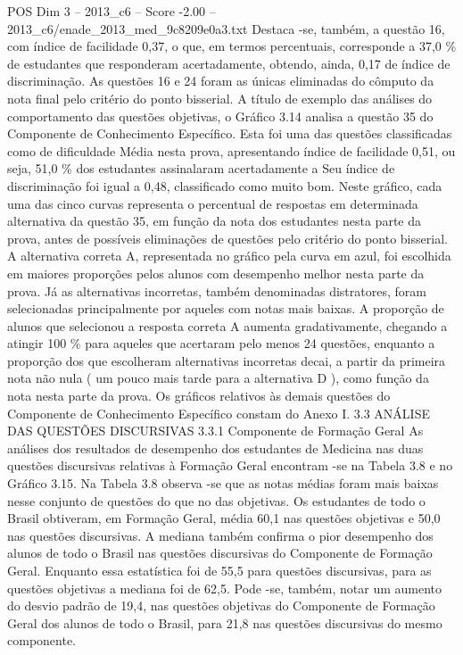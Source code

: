 \begin{textsample}{POS Dim 3 – 2013\_c6 – Score -2.00 – 2013\_c6/enade\_2013\_med\_9c8209e0a3.txt}
Destaca -se, também, a questão 16, com índice de facilidade 0,37, o que, em termos percentuais, corresponde a 37,0 \% de estudantes que responderam acertadamente, obtendo, ainda, 0,17 de índice de discriminação.
As questões 16 e 24 foram as únicas eliminadas do cômputo da nota final pelo critério do ponto bisserial.
A título de exemplo das análises do comportamento das questões objetivas, o Gráfico 3.14 analisa a questão 35 do Componente de Conhecimento Específico.
Esta foi uma das questões classificadas como de dificuldade Média nesta prova, apresentando índice de facilidade 0,51, ou seja, 51,0 \% dos estudantes assinalaram acertadamente a Seu índice de discriminação foi igual a 0,48, classificado como muito bom.
Neste gráfico, cada uma das cinco curvas representa o percentual de respostas em determinada alternativa da questão 35, em função da nota dos estudantes nesta parte da prova, antes de possíveis eliminações de questões pelo critério do ponto bisserial.
A alternativa correta A, representada no gráfico pela curva em azul, foi escolhida em maiores proporções pelos alunos com desempenho melhor nesta parte da prova.
Já as alternativas incorretas, também denominadas distratores, foram selecionadas principalmente por aqueles com notas mais baixas.
A proporção de alunos que selecionou a resposta correta A aumenta gradativamente, chegando a atingir 100 \% para aqueles que acertaram pelo menos 24 questões, enquanto a proporção dos que escolheram alternativas incorretas decai, a partir da primeira nota não nula ( um pouco mais tarde para a alternativa D ), como função da nota nesta parte da prova.
Os gráficos relativos às demais questões do Componente de Conhecimento Específico constam do Anexo I. 3.3 ANÁLISE DAS QUESTÕES DISCURSIVAS 3.3.1 Componente de Formação Geral As análises dos resultados de desempenho dos estudantes de Medicina nas duas questões discursivas relativas à Formação Geral encontram -se na Tabela 3.8 e no Gráfico 3.15.
Na Tabela 3.8 observa -se que as notas médias foram mais baixas nesse conjunto de questões do que no das objetivas.
Os estudantes de todo o Brasil obtiveram, em Formação Geral, média 60,1 nas questões objetivas e 50,0 nas questões discursivas.
A mediana também confirma o pior desempenho dos alunos de todo o Brasil nas questões discursivas do Componente de Formação Geral.
Enquanto essa estatística foi de 55,5 para questões discursivas, para as questões objetivas a mediana foi de 62,5.
Pode -se, também, notar um aumento do desvio padrão de 19,4, nas questões objetivas do Componente de Formação Geral dos alunos de todo o Brasil, para 21,8 nas questões discursivas do mesmo componente.

\end{textsample}
